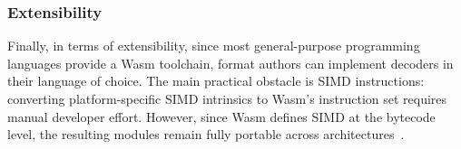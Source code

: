 \subsubsection{Extensibility}

Finally, in terms of extensibility, since most general-purpose programming languages provide a Wasm toolchain, format authors can implement decoders in their language of choice. The main practical obstacle is SIMD instructions: converting platform-specific SIMD intrinsics to Wasm's instruction set requires manual developer effort. However, since Wasm defines SIMD at the bytecode level, the resulting modules remain fully portable across architectures~\cite{gienieczkoAnyBloxFrameworkSelfDecoding2025}.